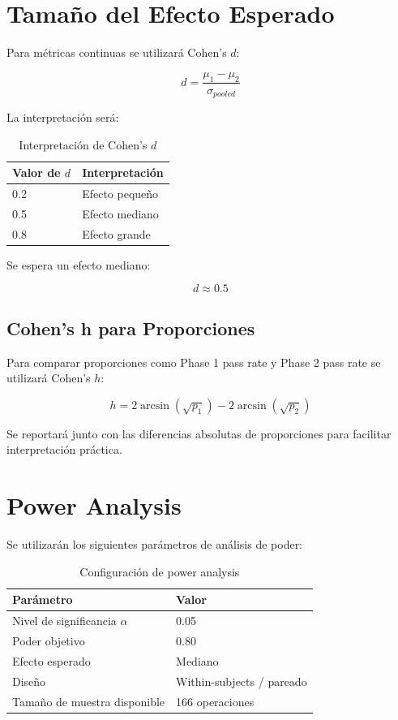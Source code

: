 \documentclass[12pt]{article}
\begin{document}
\section{Tamaño del Efecto Esperado}

Para métricas continuas se utilizará Cohen's $d$:

\[
d = \frac{\mu_1 - \mu_2}{\sigma_{pooled}}
\]

La interpretación será:

\begin{table}[H]
\centering
\begin{tabular}{p{} p{}}
\toprule
\textbf{Valor de $d$} & \textbf{Interpretación} \\
\midrule
0.2 & Efecto pequeño \\
0.5 & Efecto mediano \\
0.8 & Efecto grande \\
\bottomrule
\end{tabular}
\caption{Interpretación de Cohen's $d$}
\end{table}

Se espera un efecto mediano:

\[
d \approx 0.5
\]

\subsection{Cohen's h para Proporciones}

Para comparar proporciones como Phase 1 pass rate y Phase 2 pass rate se utilizará Cohen's $h$:

\[
h = 2\arcsin(\sqrt{p_1}) - 2\arcsin(\sqrt{p_2})
\]

Se reportará junto con las diferencias absolutas de proporciones para facilitar interpretación práctica.

\section{Power Analysis}

Se utilizarán los siguientes parámetros de análisis de poder:

\begin{table}[H]
\centering
\begin{tabular}{p{} p{}}
\toprule
\textbf{Parámetro} & \textbf{Valor} \\
\midrule
Nivel de significancia $\alpha$ & 0.05 \\
Poder objetivo & 0.80 \\
Efecto esperado & Mediano \\
Diseño & Within-subjects / pareado \\
Tamaño de muestra disponible & 166 operaciones \\
\bottomrule
\end{tabular}
\caption{Configuración de power analysis}
\end{table}
\end{document}
